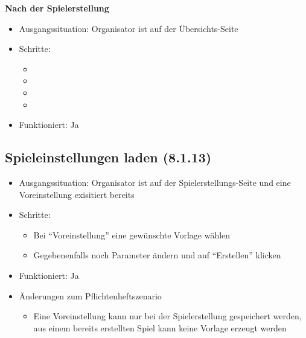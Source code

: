 \documentclass[a4paper]{scrreprt}
\begin{document}
            \textbf{Nach der Spielerstellung}
            \begin{itemize}
                \item Ausgangssituation: Organisator ist auf der Übersichts-Seite
                \item Schritte:
                    \begin{itemize}
                        \item
                        \item
                        \item
                        \item
                \end{itemize}
                \item Funktioniert: Ja
            \end{itemize}

            \subsection{Spieleinstellungen laden (8.1.13)}
            \begin{itemize}
                \item Ausgangssituation: Organisator ist auf der Spielerstellungs-Seite und eine Voreinstellung exisitiert bereits
                \item Schritte:
                    \begin{itemize}
                        \item Bei \enquote{Voreinstellung} eine gewünschte Vorlage wählen
                        \item Gegebenenfalls noch Parameter ändern und auf \enquote{Erstellen} klicken
                    \end{itemize}
                \item Funktioniert: Ja
                \item Änderungen zum Pflichtenheftszenario
                \begin{itemize}
                    \item Eine Voreinstellung kann nur bei der Spielerstellung gespeichert werden, aus einem bereits erstellten Spiel kann keine Vorlage erzeugt werden
                \end{itemize}
            \end{itemize}
\end{document}
